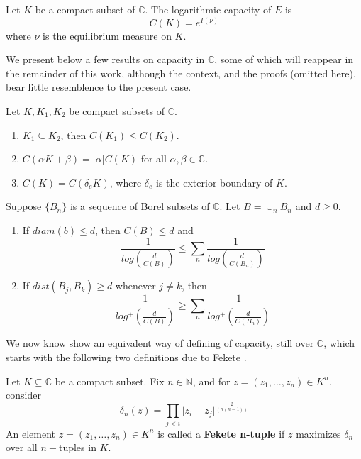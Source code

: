 \begin{definition}
\cite{rand} Let $K$ be a compact subset of $\mathbb{C}$. The logarithmic capacity of $E$ is 
\[C(K) = e^{I(\nu)}\] where $\nu$ is the equilibrium measure on $K$.
\end{definition}

We present below a few results on capacity in $\mathbb{C}$, some of which will reappear in the remainder of this work, although the context, and the proofs (omitted here), bear little resemblence to the present case.\\ 

\begin{proposition}
 Let $K,  K_1,K_2$ be compact subsets of $\mathbb{C}$.
\begin{enumerate}
\item $K_1 \subseteq K_2$, then $C(K_1) \leq C(K_2)$.
\item $C(\alpha K + \beta) = \lvert \alpha \rvert C(K)$ for all $\alpha, \beta \in \mathbb{C}$.
\item $C(K) = C(\delta_eK)$, where $\delta_e$ is the exterior boundary of $K$.
\end{enumerate}
\end{proposition}

\begin{proposition}
Suppose $\{B_n\}$ is a sequence of Borel subsets of $\mathbb{C}$. Let $B=\cup_n B_n$ and $d \geq 0$. 
\begin{enumerate}
\item If $diam(b) \leq d$, then $C(B) \leq d$ and \[\frac{1}{log(\frac{d}{C(B)})} \leq \sum_n \frac{1}{log(\frac{d}{C(B_n)})}\]
\item If $dist(B_j, B_k) \geq d$ whenever $j \neq k$, then \[\frac{1}{log^+(\frac{d}{C(B)})} \geq \sum_n \frac{1}{log^+(\frac{d}{C(B_n)})}\]
\end{enumerate}
\end{proposition}

We now know show an equivalent way of  defining of capacity, still over $\mathbb{C}$, which starts with the following two definitions due to Fekete \cite{fek}.\\ 

\begin{definition}
Let $K \subseteq \mathbb{C}$ be a compact subset. Fix $n \in \mathbb{N}$, and for $z = (z_1,\ldots,z_n) \in K^n$, consider
\[\delta_n(z) = \prod_{j < i} \lvert z_i - z_j \rvert^{\frac{2}{(n(n-1))}} \]
An element $z = (z_1,\ldots,z_n) \in K^n$ is called a \textbf{Fekete n-tuple} if $z$ maximizes $\delta_n$ over all $n-$tuples in $K$.
\end{definition}

